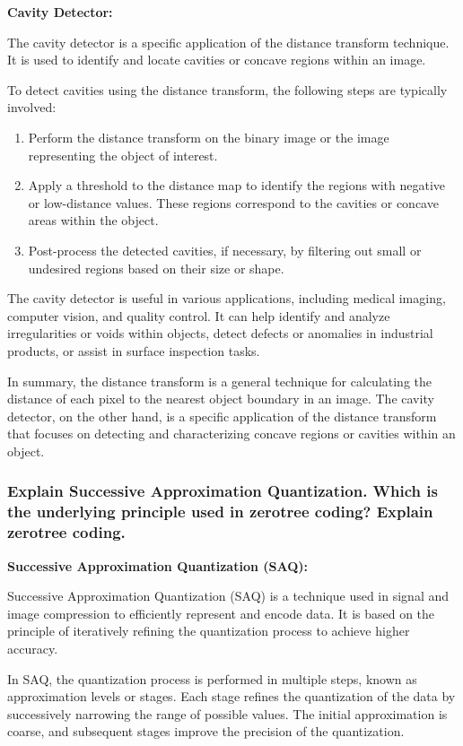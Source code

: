 \documentclass{article}
\begin{document}
\textbf{Cavity Detector:}

The cavity detector is a specific application of the distance transform technique. It is used to identify and locate cavities or concave regions within an image.

To detect cavities using the distance transform, the following steps are typically involved:
\begin{enumerate}
    \item Perform the distance transform on the binary image or the image representing the object of interest.
    \item Apply a threshold to the distance map to identify the regions with negative or low-distance values. These regions correspond to the cavities or concave areas within the object.
    \item Post-process the detected cavities, if necessary, by filtering out small or undesired regions based on their size or shape.
\end{enumerate}

The cavity detector is useful in various applications, including medical imaging, computer vision, and quality control. It can help identify and analyze irregularities or voids within objects, detect defects or anomalies in industrial products, or assist in surface inspection tasks.

In summary, the distance transform is a general technique for calculating the distance of each pixel to the nearest object boundary in an image. The cavity detector, on the other hand, is a specific application of the distance transform that focuses on detecting and characterizing concave regions or cavities within an object.

\subsubsection{Explain Successive Approximation Quantization. Which is the underlying principle used in zerotree coding? Explain zerotree coding.}
\textbf{Successive Approximation Quantization (SAQ):}

Successive Approximation Quantization (SAQ) is a technique used in signal and image compression to efficiently represent and encode data. It is based on the principle of iteratively refining the quantization process to achieve higher accuracy.

In SAQ, the quantization process is performed in multiple steps, known as approximation levels or stages. Each stage refines the quantization of the data by successively narrowing the range of possible values. The initial approximation is coarse, and subsequent stages improve the precision of the quantization.
\end{document}
